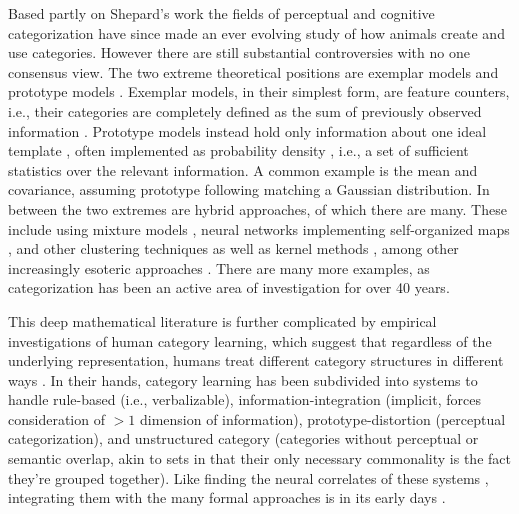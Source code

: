 Based partly on Shepard's work the fields of perceptual and cognitive categorization have since made an ever evolving study of how animals create and use categories.  However there are still substantial controversies with no one consensus view.  The two extreme theoretical positions are exemplar models and prototype models \citep{Ashby:2005p4764}.  Exemplar models, in their simplest form, are feature counters, i.e., their categories are completely defined as the sum of previously observed information \citep{Nosofsky:1988p9104}.  Prototype models instead hold only information about one ideal template \citep{Rosch:1973p9108}, often implemented as probability density \citep{Ashby:1995p9109}, i.e., a set of sufficient statistics over the relevant information.  A common example is the mean and covariance, assuming prototype following matching a Gaussian distribution.  In between the two extremes are hybrid approaches, of which there are many.  These include using mixture models \citep{Rossee:2002p9112}, neural networks implementing self-organized maps \citep{Love:2004p9110}, and other clustering techniques \citep{Kruschke:1992p9111} as well as kernel methods \citep{Jakel:2008p9113}, among other increasingly esoteric approaches \citep{Martin:2012p9185}. There are many more examples, as categorization has been an active area of investigation for over 40 years.

This deep mathematical literature is further complicated by empirical investigations of human category learning, which suggest that regardless of the underlying representation, humans treat different category structures in different ways \citep{Ashby:2011p9148}.  In their hands, category learning has been subdivided into systems to handle rule-based (i.e., verbalizable), information-integration (implicit, forces consideration of $>1$ dimension of information), prototype-distortion (perceptual categorization), and unstructured category (categories without perceptual or semantic overlap, akin to sets in that their only necessary commonality is the fact they're grouped together).  Like finding the neural correlates of these systems \citep{Ashby:2005p9152,Ashby:2006p9153}, integrating them with the many formal approaches is in its early days \citep{Ashby:2011p9148}.

